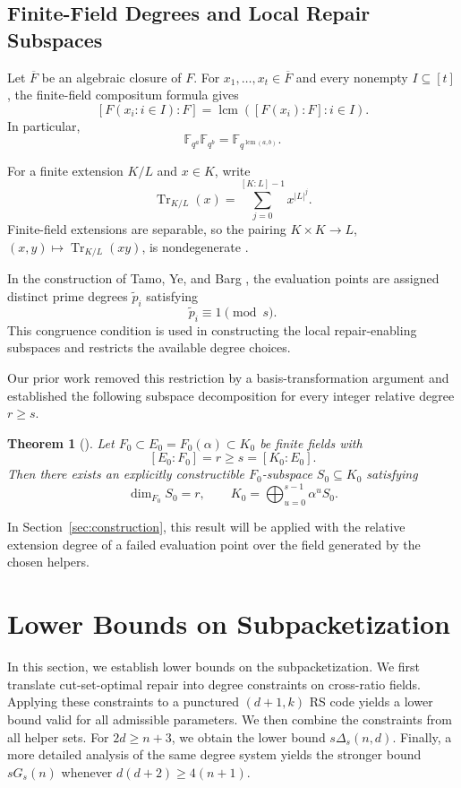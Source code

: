 \documentclass[11pt,onecolumn]{IEEEtran}
\newtheorem{theorem}{Theorem}
\newcommand{\F}{\mathbb{F}}
\newcommand{\Tr}{\operatorname{Tr}}
\newcommand{\lcmop}{\operatorname{lcm}}
\begin{document}
\subsection{Finite-Field Degrees and Local Repair Subspaces}

Let $\overline F$ be an algebraic closure of $F$.
For $x_1,\ldots,x_t\in\overline F$ and every nonempty
$I\subseteq[t]$, the finite-field compositum formula
\cite[Chapter~2]{LidlNiederreiter1997} gives
\[
[F(x_i:i\in I):F]
=\lcmop([F(x_i):F]:i\in I).
\]
In particular,
\[
\F_{q^a}\F_{q^b}=\F_{q^{\lcmop(a,b)}}.
\]

For a finite extension $K/L$ and $x\in K$, write
\[
\Tr_{K/L}(x)=\sum_{j=0}^{[K:L]-1}x^{|L|^j}.
\]
Finite-field extensions are separable, so the pairing
$K\times K\longrightarrow L$, $(x,y)\mapsto\Tr_{K/L}(xy)$, is nondegenerate
\cite[Chapter~2]{LidlNiederreiter1997}.

In the construction of Tamo, Ye, and Barg \cite{TYB2019}, the
evaluation points are assigned distinct prime degrees $\tilde p_i$ satisfying
\[
 \tilde p_i\equiv1\pmod{s}.
\]
This congruence condition is used in constructing the local
repair-enabling subspaces and restricts the available degree choices.

Our prior work \cite[Theorem~3]{Qiu2026} removed this restriction by a
basis-transformation argument and established the following subspace
decomposition for every integer relative degree $r\ge s$.
\begin{theorem}[{\cite[Theorem~3]{Qiu2026}}]
\label{thm:Qiu-local}
Let $F_0\subset E_0=F_0(\alpha)\subset K_0$ be finite fields
with
\[
[E_0:F_0]=r\ge s=[K_0:E_0].
\]
Then there exists an explicitly constructible $F_0$-subspace
$S_0\subseteq K_0$ satisfying
\[
\dim_{F_0}S_0=r,
\qquad
K_0=\bigoplus_{u=0}^{s-1}\alpha^uS_0.
\]
\end{theorem}

In Section~\ref{sec:construction}, this result will be applied
with the relative extension degree of a failed evaluation point over
the field generated by the chosen helpers.


\section{Lower Bounds on Subpacketization}
\label{sec:lower-bounds}
In this section, we establish lower bounds on the subpacketization. We first translate cut-set-optimal repair into degree constraints
on cross-ratio fields. Applying these constraints to a punctured
$(d+1,k)$ RS code yields a lower bound valid for all admissible
parameters.  We then combine the constraints from all helper sets.  For
$2d\geq n+3$, we obtain the lower bound $s\Delta_s(n,d)$.  Finally, a
more detailed analysis of the same degree system yields the stronger
bound $sG_s(n)$ whenever $d(d+2)\geq 4(n+1)$.
\end{document}
